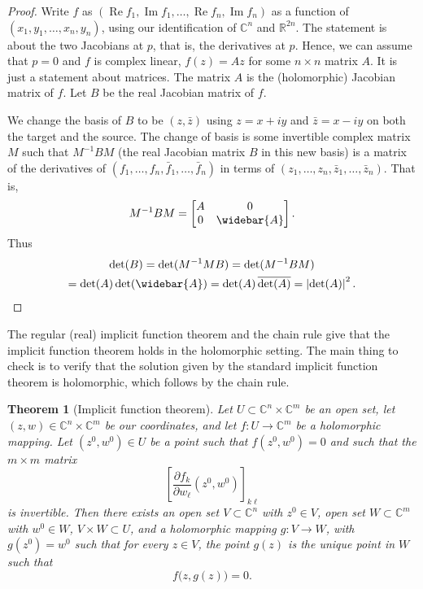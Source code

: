 \documentclass[12pt,openany]{book}
\renewcommand{\Re}{\operatorname{Re}}
\renewcommand{\Im}{\operatorname{Im}}
\newcommand{\abs}[1]{\left\lvert {#1} \right\rvert}
\newcommand{\C}{{\mathbb{C}}}
\newcommand{\R}{{\mathbb{R}}}
\theoremstyle{plain}
\newtheorem{thm}{Theorem}[section]
\theoremstyle{remark}
\theoremstyle{definition}
\theoremstyle{exercise}
\theoremstyle{example}
\begin{document}
\begin{proof}
Write $f$ as
$(\Re f_1,\Im f_1, \ldots, \Re f_n, \Im f_n)$
as a function of $(x_1,y_1,\ldots,x_n,y_n)$,
using our identification of $\C^n$ and $\R^{2n}$.
The statement is about the two Jacobians at $p$, that is, the derivatives
at $p$.  Hence, we can assume that
$p=0$ and $f$ is complex linear, $f(z) = Az$ for some $n \times n$
matrix $A$.  It is just a statement about matrices.
The matrix $A$ is the (holomorphic) Jacobian matrix of $f$.
Let $B$ be the real Jacobian matrix of $f$.

We change the basis of $B$ to be $(z,\bar{z})$
using $z = x+iy$ and $\bar{z}=x-iy$
on both the target and the source.
The change of basis is some invertible
complex matrix $M$ such that
$M^{-1} B M$ (the real Jacobian matrix $B$ in this new basis)
is a matrix of the derivatives of
$(f_1,\ldots,f_n,\bar{f}_1,\ldots,\bar{f}_n)$
in terms of
$(z_1,\ldots,z_n,\bar{z}_1,\ldots,\bar{z}_n)$.
That is,
\begin{equation*}
M^{-1} B M =
\begin{bmatrix}
A & 0 \\
0 & \widebar{A}
\end{bmatrix} .
\end{equation*}
Thus
\begin{multline*}
\det (B) =
\det(M^{-1}M B)
=
\det(M^{-1} B M)
\\
=
\det(A) \det(\widebar{A})
=
\det(A) \, \overline{\det(A)}
=
\abs{\det(A)}^2 .  \qedhere
\end{multline*}
\end{proof}

The regular (real) implicit function theorem and the chain rule
give that the implicit function theorem holds in the holomorphic setting.
The main thing to check is to verify that the solution given by the
standard implicit function theorem is holomorphic, which follows by the
chain rule.

\begin{thm}[Implicit function theorem]\label{thm:ift}%
\pagebreak[2]
Let $U \subset \C^{n} \times \C^{m}$ be an open set, let $(z,w) \in \C^n \times
\C^m$ be our coordinates, and let $f \colon U \to \C^m$
be a holomorphic mapping.  Let $(z^0,w^0) \in U$ be a point such that
$f(z^0,w^0) = 0$ and such that the $m \times m$ matrix
\begin{equation*}
\left[
\frac{\partial f_k}{\partial w_\ell} (z^0,w^0)
\right]_{k\ell}
\end{equation*}
is invertible.
Then there exists an
open set $V \subset \C^n$ with $z^0 \in V$,
open set $W \subset \C^m$ with $w^0 \in W$,
$V \times W \subset U$,
and
a holomorphic
mapping $g \colon V \to W$, with $g(z^0) = w^0$
such that
for every $z \in V$, the point $g(z)$ is the unique point in $W$
such that
\begin{equation*}
f\bigl(z,g(z)\bigr) = 0 .
\end{equation*}
\end{thm}
\end{document}
